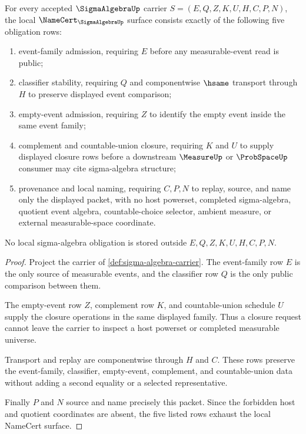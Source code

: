 \begin{theorem}
\label{thm:sigma-algebra-namecert-obligations}
For every accepted $\SigmaAlgebraUp$ carrier $S=(E,Q,Z,K,U,H,C,P,N)$, the local $\NameCert_{\SigmaAlgebraUp}$ surface consists exactly of the following five obligation rows:
\begin{enumerate}
\item event-family admission, requiring $E$ before any measurable-event read is public;
\item classifier stability, requiring $Q$ and componentwise $\hsame$ transport through $H$ to preserve displayed event comparison;
\item empty-event admission, requiring $Z$ to identify the empty event inside the same event family;
\item complement and countable-union closure, requiring $K$ and $U$ to supply displayed closure rows before a downstream $\MeasureUp$ or $\ProbSpaceUp$ consumer may cite sigma-algebra structure;
\item provenance and local naming, requiring $C,P,N$ to replay, source, and name only the displayed packet, with no host powerset, completed sigma-algebra, quotient event algebra, countable-choice selector, ambient measure, or external measurable-space coordinate.
\end{enumerate}
No local sigma-algebra obligation is stored outside $E,Q,Z,K,U,H,C,P,N$.
\end{theorem}
\begin{proof}
Project the carrier of \autoref{def:sigma-algebra-carrier}. The event-family row $E$ is the only source of measurable events, and the classifier row $Q$ is the only public comparison between them.

The empty-event row $Z$, complement row $K$, and countable-union schedule $U$ supply the closure operations in the same displayed family. Thus a closure request cannot leave the carrier to inspect a host powerset or completed measurable universe.

Transport and replay are componentwise through $H$ and $C$. These rows preserve the event-family, classifier, empty-event, complement, and countable-union data without adding a second equality or a selected representative.

Finally $P$ and $N$ source and name precisely this packet. Since the forbidden host and quotient coordinates are absent, the five listed rows exhaust the local NameCert surface.
\end{proof}

